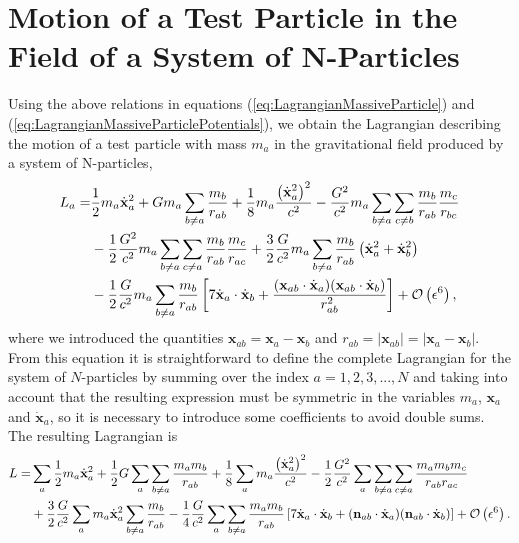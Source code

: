 \section{Motion of a Test Particle in the Field of a System of N-Particles}
Using the above relations in equations (\ref{eq:LagrangianMassiveParticle}) and (\ref{eq:LagrangianMassiveParticlePotentials}), we obtain the Lagrangian describing the motion of a test particle with mass $m_a$ in the gravitational field produced by a system of N-particles,
\begin{align}
L_a = &\frac{1}{2} m_a \dot{\textbf{x}}^2_a + G m_a \sum _{b \neq a} \frac{m_b}{r_{ab}} + \frac{1}{8} m_a \frac{ \left( \dot{\textbf{x}}^2_a \right)^2}{c^2} - \frac{G^2}{c^2} m_a \sum _{b \neq a} \sum _{c \neq b} \frac{m_b}{r_{ab}} \frac{m_c}{r_{bc}} \notag \\
& - \frac{1}{2} \frac{G^2}{c^2} m_a \sum _{b \neq a} \sum _{c \neq a} \frac{m_b}{r_{ab}} \frac{m_c}{r_{ac}} + \frac{3}{2} \frac{G}{c^2} m_a \sum _{b \neq a} \frac{m_b}{r_{ab}} \left( \dot{\textbf{x}}^2_a + \dot{\textbf{x}}^2_b \right) \notag \\
& -  \frac{1}{2} \frac{G}{c^2} m_a \sum _{b \neq a} \frac{m_b}{r_{ab}} \left[ 7 \dot{\textbf{x}}_a \cdot \dot{\textbf{x}}_b + \frac{ (\textbf{x}_{ab} \cdot \dot{\textbf{x}}_a ) (\textbf{x}_{ab} \cdot \dot{\textbf{x}}_b )}{r_{ab} ^2} \right] +  {\mathcal{O}} \left( \epsilon^6 \right) ,
\end{align}
where we introduced the quantities $ \textbf{x}_{ab} = \textbf{x}_a - \textbf{x}_b $ and $ r_{ab} =\left| \textbf{x}_{ab}  \right| =  \left| \textbf{x}_a - \textbf{x}_b \right| $. From this equation it is straightforward to define the complete Lagrangian for the system of $N$-particles by summing over the index $a=1,2,3,...,N$ and taking into account that the resulting expression must be symmetric in the variables $m_a$, $\textbf{x}_a$ and $\dot{\textbf{x}}_a$, so it is necessary to introduce some coefficients to avoid double sums. The resulting Lagrangian is
\begin{align}
L = &\sum _a  \frac{1}{2} m_a \dot{\textbf{x}}^2_a + \frac{1}{2} G \sum _a \sum _{b \neq a} \frac{m_a m_b}{r_{ab}} + \frac{1}{8} \sum _a m_a \frac{ \left( \dot{\textbf{x}}^2_a \right)^2}{c^2} - \frac{1}{2} \frac{G^2}{c^2} \sum _a  \sum _{b \neq a} \sum _{c \neq a} \frac{m_a m_b m_c}{r_{ab} r_{ac}}  \notag \\
& + \frac{3}{2} \frac{G}{c^2} \sum _a m_a \dot{\textbf{x}}^2_a  \sum _{b \neq a} \frac{m_b}{r_{ab}}   -  \frac{1}{4} \frac{G}{c^2} \sum _a  \sum _{b \neq a} \frac{m_a m_b}{r_{ab}} \left[ 7 \dot{\textbf{x}}_a \cdot \dot{\textbf{x}}_b + (\textbf{n}_{ab} \cdot \dot{\textbf{x}}_a ) (\textbf{n}_{ab} \cdot \dot{\textbf{x}}_b ) \right] +  {\mathcal{O}} \left( \epsilon^6 \right). \label{eq:NBodySystemLagrangian}
\end{align}

